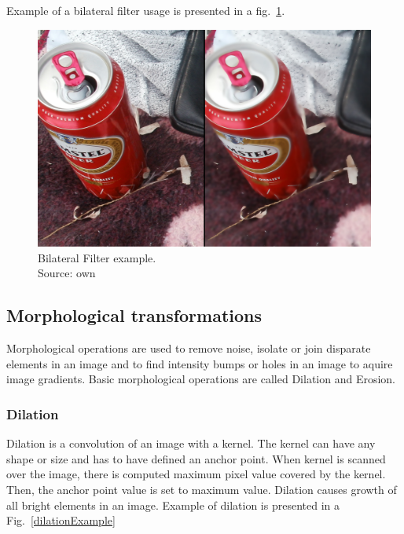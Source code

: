 \documentclass[a4paper,onecolumn,oneside,12pt]{memoir}
\begin{document}
Example of a bilateral filter usage is presented in a fig.~\ref{bilateralFilterExample}.

\begin{figure}[!ht]
\begin{center}
\includegraphics[scale=0.1]{images/BilateralFilterExample.jpg}
\caption{Bilateral Filter example. \\
Source: own}
\label{bilateralFilterExample}
\end{center}
\end{figure}

\subsection{Morphological transformations}

Morphological operations are used to remove noise, isolate or join disparate elements in an image 
and to find intensity bumps or holes in an image to aquire image gradients. Basic  morphological
operations are called Dilation and Erosion.

\subsubsection{Dilation}

Dilation is a convolution of an image with a kernel. The kernel can have any shape or size and has
to have defined an anchor point. When kernel is scanned over the image, there is computed maximum
pixel value covered by the kernel. Then, the anchor point value is set to maximum value. Dilation
causes growth of all bright elements in an image. Example of dilation is presented in a
Fig.~\ref{dilationExample}
\end{document}
